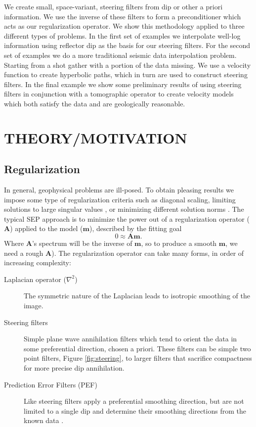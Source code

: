 
We create small, space-variant, steering filters from dip or other a priori 
information.
We use the inverse of these filters to form a preconditioner which acts
as our regularization operator.
We show this methodology applied to three different types of problems. In the 
first set of examples we interpolate 
well-log information using reflector dip as the basis for our steering  filters.
For the second set of examples we do a more traditional 
seismic data interpolation problem.  Starting
from a shot gather with a portion of the data missing.  We use a velocity
function to create hyperbolic paths, which in turn are used to construct 
steering filters.
In the final example we show some preliminary
results of using steering filters in conjunction with 
a tomographic  operator to create velocity models which both satisfy
the data and are geologically reasonable.

\section{THEORY/MOTIVATION}
\subsection{Regularization}

In general, geophysical problems are ill-posed.
To obtain  pleasing results we impose some type of regularization
criteria such as
diagonal scaling, limiting solutions to large 
singular values \cite[]{Clapp.sep.84.75},  or
minimizing different solution norms \cite[]{Nichols.sep.82.1}.
The 
typical  SEP approach is to minimize the power out of a regularization
operator ($\mathbf A$) applied to the model ($\mathbf m$),
described by the fitting goal
\begin{equation}
0 \approx \mathbf A  \mathbf m .
\label{eq:first}
\end{equation}
Where $\mathbf A$'s spectrum will be the inverse of $\mathbf m$,
so to produce a smooth $\mathbf m$, we need a rough 
$\mathbf A$\cite[]{Claerbout.tdf.82}).
The regularization operator can take many forms, in order of increasing
complexity:
\begin{description}
        \item [Laplacian operator ($\nabla^2$)] The symmetric nature of the
Laplacian leads to isotropic smoothing of the image.
  \item [Steering filters] Simple plane wave annihilation filters which
   tend to orient the data in 
   some preferential direction,
   chosen a priori. These filters can be simple two point filters,
   Figure \ref{fig:steering}, to larger filters that sacrifice compactness for
   more precise dip annihilation.

        \item  [Prediction Error Filters (PEF)] Like steering filters apply a 
   preferential smoothing direction, but are not limited to a single dip
    and determine their smoothing directions
         from the known data \cite[]{Schwab.sep.94.matt2}.
\end{description}



